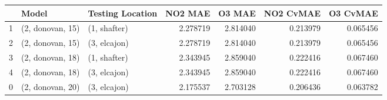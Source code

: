 \begin{tabular}{lllrrrr}
\toprule
{} &             Model & Testing Location &   NO2 MAE &    O3 MAE &  NO2 CvMAE &  O3 CvMAE \\
\midrule
1 &  (2, donovan, 15) &     (1, shafter) &  2.278719 &  2.814040 &   0.213979 &  0.065456 \\
2 &  (2, donovan, 15) &     (3, elcajon) &  2.278719 &  2.814040 &   0.213979 &  0.065456 \\
3 &  (2, donovan, 18) &     (1, shafter) &  2.343945 &  2.859040 &   0.222416 &  0.067460 \\
4 &  (2, donovan, 18) &     (3, elcajon) &  2.343945 &  2.859040 &   0.222416 &  0.067460 \\
0 &  (2, donovan, 20) &     (3, elcajon) &  2.175537 &  2.703128 &   0.206436 &  0.063782 \\
\bottomrule
\end{tabular}
